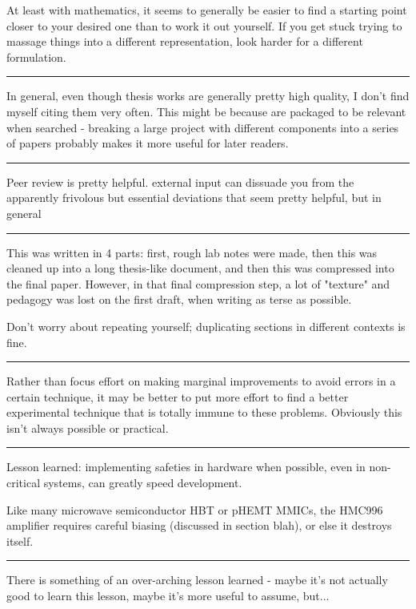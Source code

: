 \documentclass[paper.tex]{subfiles}
\begin{document}
At least with mathematics, it seems to generally be easier to find a starting point closer to your desired one than to work it out yourself. If you get stuck trying to massage things into a different representation, look harder for a different formulation.

\rule{\linewidth}{0.2pt}

In general, even though thesis works are generally pretty high quality, I don't find myself citing them very often. This might be because are packaged to be relevant when searched - breaking a large project with different components into a series of papers probably makes it more useful for later readers.

\rule{\linewidth}{0.2pt}

Peer review is pretty helpful. external input can dissuade you from the apparently frivolous but essential deviations that seem pretty helpful, but in general 

\rule{\linewidth}{0.2pt}

This was written in 4 parts: first, rough lab notes were made, then this was cleaned up into a long thesis-like document, and then this was compressed into the final paper. However, in that final compression step, a lot of "texture" and pedagogy was lost on the first draft, when writing as terse as possible. 

Don't worry about repeating yourself; duplicating sections in different contexts is fine.

\rule{\linewidth}{0.2pt}

Rather than focus effort on making marginal improvements to avoid errors in a certain technique, it may be better to put more effort to find a better experimental technique that is totally immune to these problems. Obviously this isn't always possible or practical.


\rule{\linewidth}{0.2pt}


Lesson learned: implementing safeties in hardware when possible, even in non-critical systems, can greatly speed development.

Like many microwave semiconductor HBT or pHEMT MMICs, the HMC996 amplifier requires careful biasing (discussed in section blah), or else it destroys itself. 






\rule{\linewidth}{0.2pt}


There is something of an over-arching lesson learned - maybe it's not actually good to learn this lesson, maybe it's more useful to assume, but...
\end{document}
